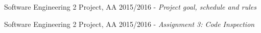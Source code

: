 \begin{thebibliography}{1}
    	Software Engineering 2 Project, AA 2015/2016 - \emph{Project goal, schedule and rules}

    	Software Engineering 2 Project, AA 2015/2016 - \emph{Assignment 3: Code Inspection}
\end{thebibliography}
